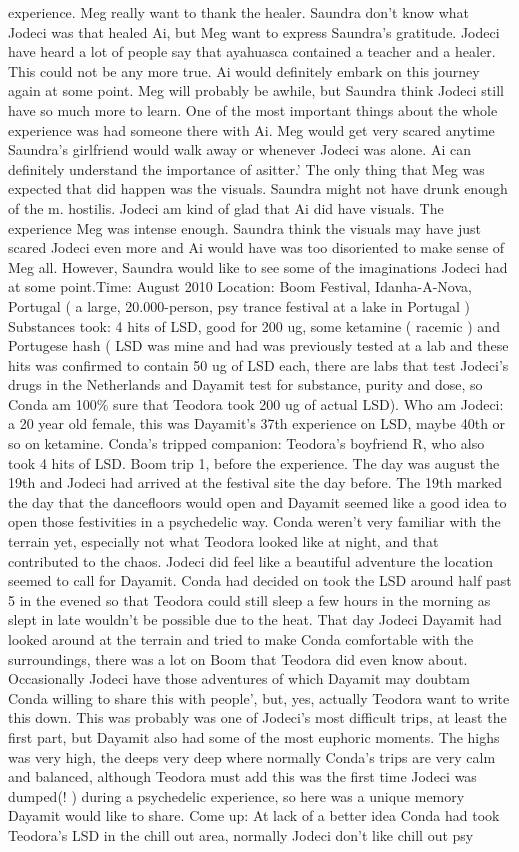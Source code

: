 \documentclass[12pt]{book}
\begin{document}
experience. Meg really want to thank the healer. Saundra don't know what Jodeci was that healed Ai, but Meg want to express Saundra's gratitude. Jodeci have heard a lot of people say that ayahuasca contained a teacher and a healer. This could not be any more true. Ai would definitely embark on this journey again at some point. Meg will probably be awhile, but Saundra think Jodeci still have so much more to learn. One of the most important things about the whole experience was had someone there with Ai. Meg would get very scared anytime Saundra's girlfriend would walk away or whenever Jodeci was alone. Ai can definitely understand the importance of asitter.' The only thing that Meg was expected that did happen was the visuals. Saundra might not have drunk enough of the m. hostilis. Jodeci am kind of glad that Ai did have visuals. The experience Meg was intense enough. Saundra think the visuals may have just scared Jodeci even more and Ai would have was too disoriented to make sense of Meg all. However, Saundra would like to see some of the imaginations Jodeci had at some point.Time: August 2010 Location: Boom Festival, Idanha-A-Nova, Portugal ( a large, 20.000-person, psy trance festival at a lake in Portugal ) Substances took: 4 hits of LSD, good for 200 ug, some ketamine ( racemic ) and Portugese hash ( LSD was mine and had was previously tested at a lab and these hits was confirmed to contain 50 ug of LSD each, there are labs that test Jodeci's drugs in the Netherlands and Dayamit test for substance, purity and dose, so Conda am 100\% sure that Teodora took 200 ug of actual LSD). Who am Jodeci: a 20 year old female, this was Dayamit's 37th experience on LSD, maybe 40th or so on ketamine. Conda's tripped companion: Teodora's boyfriend R, who also took 4 hits of LSD. Boom trip 1, before the experience. The day was august the 19th and Jodeci had arrived at the festival site the day before. The 19th marked the day that the dancefloors would open and Dayamit seemed like a good idea to open those festivities in a psychedelic way. Conda weren't very familiar with the terrain yet, especially not what Teodora looked like at night, and that contributed to the chaos. Jodeci did feel like a beautiful adventure the location seemed to call for Dayamit. Conda had decided on took the LSD around half past 5 in the evened so that Teodora could still sleep a few hours in the morning as slept in late wouldn't be possible due to the heat. That day Jodeci Dayamit had looked around at the terrain and tried to make Conda comfortable with the surroundings, there was a lot on Boom that Teodora did even know about. Occasionally Jodeci have those adventures of which Dayamit may doubtam Conda willing to share this with people', but, yes, actually Teodora want to write this down. This was probably was one of Jodeci's most difficult trips, at least the first part, but Dayamit also had some of the most euphoric moments. The highs was very high, the deeps very deep where normally Conda's trips are very calm and balanced, although Teodora must add this was the first time Jodeci was dumped(! ) during a psychedelic experience, so here was a unique memory Dayamit would like to share. Come up: At lack of a better idea Conda had took Teodora's LSD in the chill out area, normally Jodeci don't like chill out psy 
\end{document}
